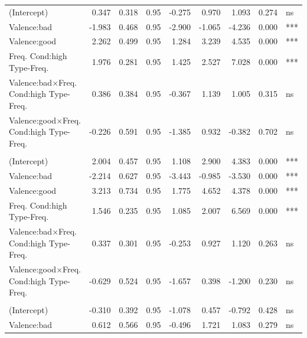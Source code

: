 \documentclass[
]{article}
\begin{document}
\begin{longtable}[t]{lrrrrrrrl}
\hspace{1em}(Intercept) & 0.347 & 0.318 & 0.95 & -0.275 & 0.970 & 1.093 & 0.274 & ns\\
\hspace{1em}Valence:bad & -1.983 & 0.468 & 0.95 & -2.900 & -1.065 & -4.236 & 0.000 & ***\\
\hspace{1em}Valence:good & 2.262 & 0.499 & 0.95 & 1.284 & 3.239 & 4.535 & 0.000 & ***\\
Freq.
Cond:high
\hspace{1em}Type-Freq. & 1.976 & 0.281 & 0.95 & 1.425 & 2.527 & 7.028 & 0.000 & ***\\
Valence:bad$\times$Freq.
Cond:high
\hspace{1em}Type-Freq. & 0.386 & 0.384 & 0.95 & -0.367 & 1.139 & 1.005 & 0.315 & ns\\
Valence:good$\times$Freq.
Cond:high
\hspace{1em}Type-Freq. & -0.226 & 0.591 & 0.95 & -1.385 & 0.932 & -0.382 & 0.702 & ns\\
\addlinespace[0.3em]
\multicolumn{9}{l}{\textbf{Third Party Acceptability - Testable}}\\
\hspace{1em}(Intercept) & 2.004 & 0.457 & 0.95 & 1.108 & 2.900 & 4.383 & 0.000 & ***\\
\hspace{1em}Valence:bad & -2.214 & 0.627 & 0.95 & -3.443 & -0.985 & -3.530 & 0.000 & ***\\
\hspace{1em}Valence:good & 3.213 & 0.734 & 0.95 & 1.775 & 4.652 & 4.378 & 0.000 & ***\\
Freq.
Cond:high
\hspace{1em}Type-Freq. & 1.546 & 0.235 & 0.95 & 1.085 & 2.007 & 6.569 & 0.000 & ***\\
Valence:bad$\times$Freq.
Cond:high
\hspace{1em}Type-Freq. & 0.337 & 0.301 & 0.95 & -0.253 & 0.927 & 1.120 & 0.263 & ns\\
Valence:good$\times$Freq.
Cond:high
\hspace{1em}Type-Freq. & -0.629 & 0.524 & 0.95 & -1.657 & 0.398 & -1.200 & 0.230 & ns\\
\addlinespace[0.3em]
\multicolumn{9}{l}{\textbf{Prevalence - Students}}\\
\hspace{1em}(Intercept) & -0.310 & 0.392 & 0.95 & -1.078 & 0.457 & -0.792 & 0.428 & ns\\
\hspace{1em}Valence:bad & 0.612 & 0.566 & 0.95 & -0.496 & 1.721 & 1.083 & 0.279 & ns\\

\end{longtable}
\end{document}
